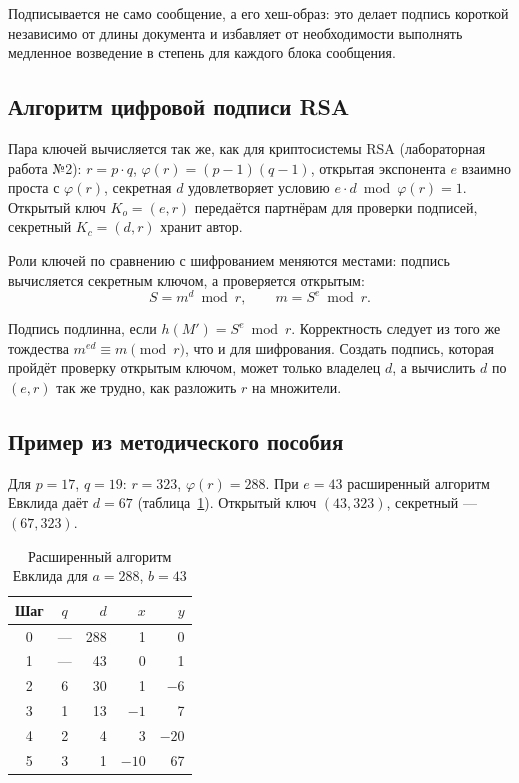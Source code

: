 \documentclass[14pt,a4paper]{extarticle}
\begin{document}
Подписывается не само сообщение, а его хеш-образ: это делает подпись короткой
независимо от длины документа и избавляет от необходимости выполнять медленное
возведение в степень для каждого блока сообщения.

\subsection{Алгоритм цифровой подписи RSA}

Пара ключей вычисляется так же, как для криптосистемы RSA (лабораторная работа №2):
$r = p \cdot q$, $\varphi(r) = (p - 1)(q - 1)$, открытая экспонента $e$ взаимно проста с
$\varphi(r)$, секретная $d$ удовлетворяет условию $e \cdot d \bmod \varphi(r) = 1$.
Открытый ключ $K_o = (e, r)$ передаётся партнёрам для проверки подписей, секретный
$K_c = (d, r)$ хранит автор.

Роли ключей по сравнению с шифрованием меняются местами: подпись вычисляется
секретным ключом, а проверяется открытым:
\begin{equation}
S = m^{d} \bmod r, \qquad m = S^{e} \bmod r.
\end{equation}

Подпись подлинна, если $h(M') = S^e \bmod r$. Корректность следует из того же
тождества $m^{ed} \equiv m \pmod r$, что и для шифрования. Создать подпись, которая
пройдёт проверку открытым ключом, может только владелец $d$, а вычислить $d$ по
$(e, r)$ так же трудно, как разложить $r$ на множители.

\subsection{Пример из методического пособия}

Для $p = 17$, $q = 19$: $r = 323$, $\varphi(r) = 288$. При $e = 43$ расширенный алгоритм
Евклида даёт $d = 67$ (таблица~\ref{tab:euclid}). Открытый ключ $(43, 323)$,
секретный --- $(67, 323)$.

\begin{table}[H]
\caption{Расширенный алгоритм Евклида для $a = 288$, $b = 43$}
\label{tab:euclid}
\centering
\begin{tabular}{ccrrr}
\toprule
Шаг & $q$ & $d$ & $x$ & $y$ \\
\midrule
0 & --- & 288 & 1 & 0 \\
1 & --- & 43 & 0 & 1 \\
2 & 6 & 30 & 1 & $-6$ \\
3 & 1 & 13 & $-1$ & 7 \\
4 & 2 & 4 & 3 & $-20$ \\
5 & 3 & 1 & $-10$ & 67 \\
\bottomrule
\end{tabular}
\end{table}
\end{document}
